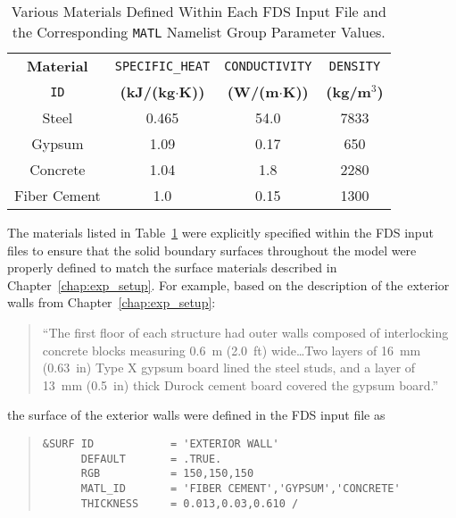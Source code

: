 \begin{table}[!ht]
\cprotect\caption{Various Materials Defined Within Each FDS Input File and the Corresponding \verb|MATL| Namelist Group Parameter Values.}
\begin{center}
\begin{tabular}{cccc}
\toprule
\textbf{Material}  		& \verb|SPECIFIC_HEAT|	& \verb|CONDUCTIVITY| 	& \verb|DENSITY| 	\\
\verb|ID|		& \textbf{(kJ/(kg$\cdot$K))} 	& 	\textbf{(W/(m$\cdot$K))} 	&  \textbf{(kg/m$^3$)} 		\\
\midrule
Steel 			& 		0.465   		&  		 54.0	 		& 	 7833  			\\
Gypsum 			& 		1.09    		&  		 0.17	 		& 	  650  			\\
Concrete 		& 		1.04    		&  		 1.8	 		& 	 2280  			\\
Fiber Cement 	& 		1.0     		&  		 0.15	 		& 	 1300  			\\
\bottomrule
\end{tabular}
\end{center}
\label{table:material_props}
\end{table}
\FloatBarrier




The materials listed in Table~\ref{table:material_props} were explicitly specified within the FDS input files to ensure that the solid boundary surfaces throughout the model were properly defined to match the surface materials described in Chapter~\ref{chap:exp_setup}. For example, based on the description of the exterior walls from Chapter~\ref{chap:exp_setup}:  
\begin{quote}
``The first floor of each structure had outer walls composed of interlocking concrete blocks measuring 0.6~m (2.0~ft) wide\ldots Two layers of 16~mm (0.63~in) Type X gypsum board lined the steel studs, and a layer of 13~mm (0.5~in) thick Durock cement board covered the gypsum board.''
\end{quote}
the surface of the exterior walls were defined in the FDS input file as 
\begin{quote}
\begin{verbatim}
&SURF ID            = 'EXTERIOR WALL'
      DEFAULT       = .TRUE.
      RGB           = 150,150,150
      MATL_ID       = 'FIBER CEMENT','GYPSUM','CONCRETE'
      THICKNESS     = 0.013,0.03,0.610 /
\end{verbatim}
\end{quote}

